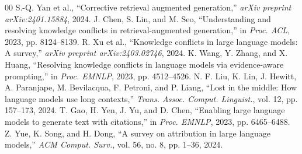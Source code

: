 \documentclass[conference]{IEEEtran}
\begin{document}
\begin{thebibliography}{00}
 S.-Q. Yan et al., ``Corrective retrieval augmented generation,'' \textit{arXiv preprint arXiv:2401.15884}, 2024.
 J. Chen, S. Lin, and M. Seo, ``Understanding and resolving knowledge conflicts in retrieval-augmented generation,'' in \textit{Proc. ACL}, 2023, pp. 8124--8139.
 R. Xu et al., ``Knowledge conflicts in large language models: A survey,'' \textit{arXiv preprint arXiv:2403.02746}, 2024.
 K. Wang, Y. Zhang, and X. Huang, ``Resolving knowledge conflicts in language models via evidence-aware prompting,'' in \textit{Proc. EMNLP}, 2023, pp. 4512--4526.
 N. F. Liu, K. Lin, J. Hewitt, A. Paranjape, M. Bevilacqua, F. Petroni, and P. Liang, ``Lost in the middle: How language models use long contexts,'' \textit{Trans. Assoc. Comput. Linguist.}, vol. 12, pp. 157--173, 2024.
 T. Gao, H. Yen, J. Yu, and D. Chen, ``Enabling large language models to generate text with citations,'' in \textit{Proc. EMNLP}, 2023, pp. 6465--6488.
 Z. Yue, K. Song, and H. Dong, ``A survey on attribution in large language models,'' \textit{ACM Comput. Surv.}, vol. 56, no. 8, pp. 1--36, 2024.
\end{thebibliography}
\end{document}
